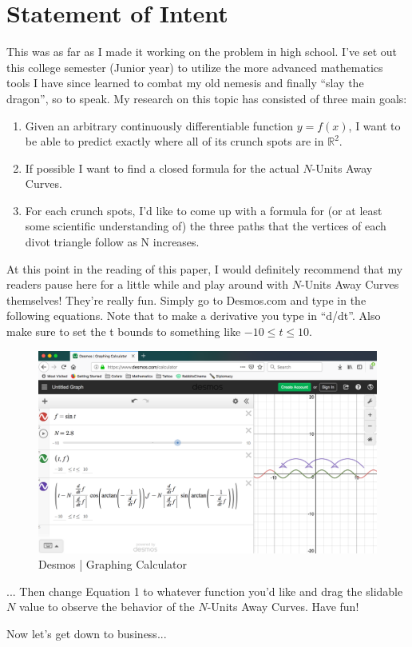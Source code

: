 \section{Statement of Intent}

This was as far as I made it working on the problem in high school. I’ve set out this college semester (Junior year) to utilize the more advanced mathematics tools I have since learned to combat my old nemesis and finally ``slay the dragon'', so to speak. My research on this topic has consisted of three main goals:

\begin{enumerate}
    \item Given an arbitrary continuously differentiable function $y = f(x)$, I want to be able to predict exactly where all of its crunch spots are in $\mathbb{R}^2$.
    \item If possible I want to find a closed formula for the actual $N$-Units Away Curves.
    \item For each crunch spots, I’d like to come up with a formula for (or at least some scientific understanding of) the three paths that the vertices of each divot triangle follow as N increases.

\end{enumerate}

At this point in the reading of this paper, I would definitely recommend that my readers pause here for a little while and play around with $N$-Units Away Curves themselves! They’re really fun. Simply go to Desmos.com and type in the following equations. Note that to make a derivative you type in ``d/dt''. Also make sure to set the t bounds to something like $-10 \leq t \leq 10$.

\begin{figure}[ht]
  \centering
  \begin{minipage}[b]{0.8\linewidth}
  \includegraphics[width=\linewidth]{statement-of-intent-img/Desmos.png}
  \caption{Desmos | Graphing Calculator}
  \label{fig:desmos}
  \end{minipage}
\end{figure}

... Then change Equation 1 to whatever function you’d like and drag the slidable $N$ value to
observe the behavior of the $N$-Units Away Curves. Have fun!

Now let’s get down to business...